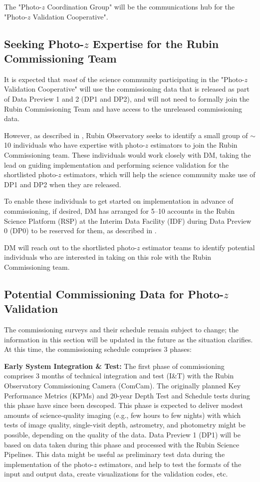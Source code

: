 \documentclass[DM,authoryear,toc]{lsstdoc}
\begin{document}
The "Photo-$z$ Coordination Group" will be the communications hub for the "Photo-$z$ Validation Cooperative". 


\subsection{Seeking Photo-$z$ Expertise for the Rubin Commissioning Team}

It is expected that \textit{most} of the science community participating in the "Photo-$z$ Validation Cooperative" will use the commissioning data that is released as part of Data Preview 1 and 2 (DP1 and DP2), and will not need to formally join the Rubin Commissioning Team and have access to the unreleased commissioning data.

However, as described in \cite{sitcomtn-010}, Rubin Observatory seeks to identify a small group of $\sim$10 individuals who have expertise with photo-$z$ estimators to join the Rubin Commissioning team.
These individuals would work closely with DM, taking the lead on guiding implementation and performing science validation for the shortlisted photo-$z$ estimators, which will help the science community make use of DP1 and DP2 when they are released.

To enable these individuals to get started on implementation in advance of commissioning, if desired, DM has arranged for 5--10 accounts in the Rubin Science Platform (RSP) at the Interim Data Facility (IDF) during Data Preview 0 (DP0) to be reserved for them, as described in \cite{rtn-004}.

DM will reach out to the shortlisted photo-$z$ estimator teams to identify potential individuals who are interested in taking on this role with the Rubin Commissioning team.


\subsection{Potential Commissioning Data for Photo-$z$ Validation}\label{ssec:pzcoop_commissioning}

The commissioning surveys and their schedule remain subject to change; the information in this section will be updated in the future as the situation clarifies.
At this time, the commissioning schedule comprises 3 phases: 

{\bf Early System Integration \& Test:}
The first phase of commissioning comprises 3 months of technical integration and test (I\&T) with the Rubin Observatory Commissioning Camera (ComCam).
The originally planned Key Performance Metrics (KPMs) and 20-year Depth Test and Schedule tests during this phase have since been descoped. 
This phase is expected to deliver modest amounts of science-quality imaging (e.g., few hours to few nights) with which tests of image quality, single-visit depth, astrometry, and photometry might be possible, depending on the quality of the data.  
Data Preview 1 (DP1) will be based on data taken during this phase and processed with the Rubin Science Pipelines. 
This data might be useful as preliminary test data during the implementation of the photo-$z$ estimators, and help to test the formats of the input and output data, create visualizations for the validation codes, etc.
\end{document}
